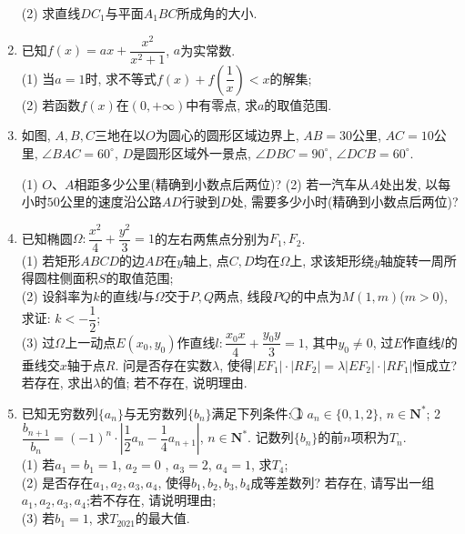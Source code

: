 \documentclass[10pt,a4paper]{article}
\begin{document}
\begin{enumerate}[1.]
(2) 求直线$DC_1$与平面$A_1BC$所成角的大小.
\item 已知$f(x)=ax+\dfrac{x^2}{x^2+1}$, $a$为实常数.\\
(1) 当$a=1$时, 求不等式$f(x)+f(\dfrac 1x)<x$的解集;\\
(2) 若函数$f(x)$在$(0,+\infty)$中有零点, 求$a$的取值范围.
\item 如图, $A,B,C$三地在以$O$为圆心的圆形区域边界上, $AB=30$公里, $AC=10$公里, $\angle BAC=60^\circ$, $D$是圆形区域外一景点, $\angle DBC=90^\circ$, $\angle DCB=60^\circ$.
\begin{center}
\end{center}
(1) $O$、$A$相距多少公里(精确到小数点后两位)?
(2) 若一汽车从$A$处出发, 以每小时$50$公里的速度沿公路$AD$行驶到$D$处, 需要多少小时(精确到小数点后两位)?
\item 已知椭圆$\Omega :\dfrac{x^2}4+\dfrac{y^2}3=1$的左右两焦点分别为$F_1,F_2$.\\
(1) 若矩形$ABCD$的边$AB$在$y$轴上, 点$C,D$均在$\Omega$上, 求该矩形绕$y$轴旋转一周所得圆柱侧面积$S$的取值范围;\\
(2) 设斜率为$k$的直线$l$与$\Omega$交于$P,Q$两点, 线段$PQ$的中点为$M(1,m)$($m>0$), 求证: $k<-\dfrac 12$;\\
(3) 过$\Omega$上一动点$E(x_0,y_0)$作直线$l:\dfrac{x_0x}4+\dfrac{y_0y}3=1$, 其中$y_0\ne 0$, 过$E$作直线$l$的垂线交$x$轴于点$R$. 问是否存在实数$\lambda$, 使得$|EF_1|\cdot |RF_2|=\lambda |EF_2|\cdot |RF_1|$恒成立? 若存在, 求出$\lambda$的值; 若不存在, 说明理由.
\item 已知无穷数列$\{a_n\}$与无穷数列$\{b_n\}$满足下列条件:
\textcircled{1} $a_n\in \{0,1,2\}$, $n\in \mathbf{N}^*$; \textcircled{2} $\dfrac{b_{n+1}}{b_n}=(-1)^n\cdot |\dfrac 12a_n-\dfrac 14a_{n+1}|$, $n\in \mathbf{N}^*$. 记数列$\{b_n\}$的前$n$项积为$T_n$.\\
(1) 若$a_1=b_1=1$, $a_2=0$ , $a_3=2$, $a_4=1$, 求$T_4$;\\
(2) 是否存在$a_1,a_2,a_3,a_4$, 使得$b_1,b_2,b_3,b_4$成等差数列? 若存在, 请写出一组$a_1,a_2,a_3,a_4$;若不存在, 请说明理由;\\
(3) 若$b_1=1$, 求$T_{2021}$的最大值.


\end{enumerate}
\end{document}
